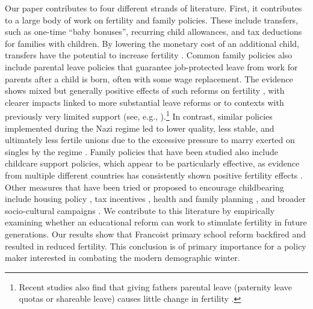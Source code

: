 \documentclass[a4paper,oneside,final,onecolumn,12pt,english]{article}
\begin{document}
Our paper contributes to four different strands of literature. First, it contributes to a large body of work on fertility and family policies. These include transfers, such as one-time “baby bonuses”, recurring child allowances, and tax deductions for families with children. By lowering the monetary cost of an additional child, transfers have the potential to increase fertility \citep{milligan2005subsidizing, cohen2013financial, gonzalez2013effect, slonimczyk2014assessing, malak2019baby, tudor2020financial, gonzalez2023cash, kim2023paid}. Common family policies also include parental leave policies that guarantee job-protected leave from work for parents after a child is born, often with some wage replacement. The evidence shows mixed but generally positive effects of such reforms on fertility \citep{lalive2009does, dahl2016case, cannonier2014does, golightly2022does, bailey2025long}, with clearer impacts linked to more substantial leave reforms or to contexts with previously very limited support (see, e.g., \cite{raute2019can}).\footnote{Recent studies also find that giving fathers parental leave (paternity leave quotas or shareable leave) causes little change in fertility \citep{lee2009childcare, cools2015causal, farre2019does, duvander2020impact}.} %
In contrast, similar policies implemented during the Nazi regime led to lower quality, less stable, and ultimately less fertile unions due to the excessive pressure to marry exerted on singles by the regime \citep{baudin2024}. Family policies that have been studied also include childcare support policies, which appear to be particularly effective, as evidence from multiple different countries has consistently shown positive fertility effects \citep{rindfuss2010child, havnes2011no, mork2013childcare, bauernschuster2016children, wood2019local}. Other measures that have been tried or proposed to encourage childbearing include housing policy \citep{clark2012women, fazio2024housing}, tax incentives \citep{parent2007tax, cohen2013financial, laroque2014identifying}, health and family planning \citep{abramowitz2018planning, gartner2022impacts}, and broader socio-cultural campaigns \citep{zeng2016effects, lin2024effect}. We contribute to this literature by empirically examining whether an educational reform can work to stimulate fertility in future generations. Our results show that Francoist primary school reform backfired and resulted in reduced fertility. This conclusion is of primary importance for a policy maker interested in combating the modern demographic winter.
\end{document}
